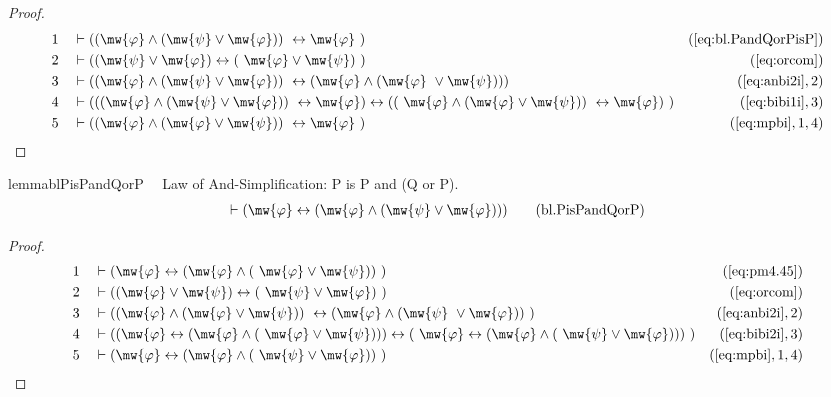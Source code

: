 \begin{proof}
\begin{align}
  1 &&  & \vdash ( ( \mw{\varphi} \wedge ( \mw{\psi} \vee \mw{\varphi} ) )
     ~\leftrightarrow \mw{\varphi}
     ~)&(\mbox{\ref{eq:bl.PandQorPisP}})\notag
  \\ 2 &&  & \vdash ( ( \mw{\psi} \vee \mw{\varphi} ) \leftrightarrow (
     ~\mw{\varphi} \vee \mw{\psi} )
     ~)&(\mbox{\ref{eq:orcom}})\notag
  \\ 3 &&  & \vdash ( ( \mw{\varphi} \wedge ( \mw{\psi} \vee \mw{\varphi} ) )
     ~\leftrightarrow ( \mw{\varphi} \wedge ( \mw{\varphi}
     ~\vee \mw{\psi} ) ) )&(\mbox{\ref{eq:anbi2i}},2)\notag
  \\ 4 &&  & \vdash ( ( ( \mw{\varphi} \wedge ( \mw{\psi} \vee \mw{\varphi} ) )
     ~\leftrightarrow \mw{\varphi} ) \leftrightarrow ( (
     ~\mw{\varphi} \wedge ( \mw{\varphi} \vee \mw{\psi} ) )
     ~\leftrightarrow \mw{\varphi} )
     ~)&(\mbox{\ref{eq:bibi1i}},3)\notag
  \\ 5 &&  & \vdash ( ( \mw{\varphi} \wedge ( \mw{\varphi} \vee \mw{\psi} ) )
     ~\leftrightarrow \mw{\varphi}
     ~)&(\mbox{\ref{eq:mpbi}},1,4)\notag
\end{align}
\end{proof}

\begin{restatable}{lemma}{blPisPandQorP}~~ Law of And-Simplification: P is P
and (Q or P).
\begin{align}
\vdash ( \mw{\varphi} \leftrightarrow ( \mw{\varphi} \wedge ( \mw{\psi} \vee
    \mw{\varphi} ) ) )\label{eq:bl.PisPandQorP}\tag{bl.PisPandQorP}
\end{align}
\end{restatable}

\begin{proof}
\begin{align}
  1 &&  & \vdash ( \mw{\varphi} \leftrightarrow ( \mw{\varphi} \wedge (
     ~\mw{\varphi} \vee \mw{\psi} ) )
     ~)&(\mbox{\ref{eq:pm4.45}})\notag
  \\ 2 &&  & \vdash ( ( \mw{\varphi} \vee \mw{\psi} ) \leftrightarrow (
     ~\mw{\psi} \vee \mw{\varphi} )
     ~)&(\mbox{\ref{eq:orcom}})\notag
  \\ 3 &&  & \vdash ( ( \mw{\varphi} \wedge ( \mw{\varphi} \vee \mw{\psi} ) )
     ~\leftrightarrow ( \mw{\varphi} \wedge ( \mw{\psi}
     ~\vee \mw{\varphi} ) )
     ~)&(\mbox{\ref{eq:anbi2i}},2)\notag
  \\ 4 &&  & \vdash ( ( \mw{\varphi} \leftrightarrow ( \mw{\varphi} \wedge (
     ~\mw{\varphi} \vee \mw{\psi} ) ) ) \leftrightarrow (
     ~\mw{\varphi} \leftrightarrow ( \mw{\varphi} \wedge (
     ~\mw{\psi} \vee \mw{\varphi} ) ) )
     ~)&(\mbox{\ref{eq:bibi2i}},3)\notag
  \\ 5 &&  & \vdash ( \mw{\varphi} \leftrightarrow ( \mw{\varphi} \wedge (
     ~\mw{\psi} \vee \mw{\varphi} ) )
     ~)&(\mbox{\ref{eq:mpbi}},1,4)\notag
\end{align}
\end{proof}

